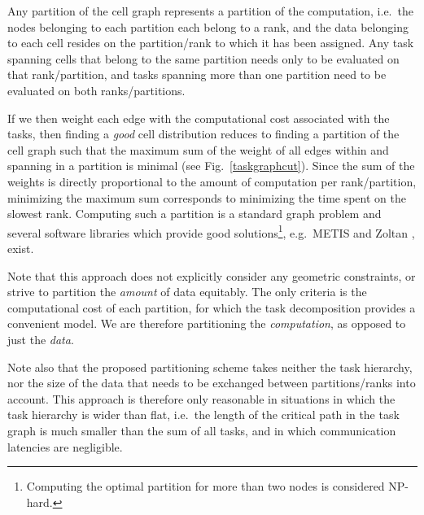 \documentclass{sig-alternate-05-2015}
\begin{document}
Any partition of the cell graph represents a partition of the
computation, i.e.~the nodes belonging to each partition each belong
to a rank, and the
data belonging to each cell resides on the partition/rank to which
it has been assigned.
Any task spanning cells that belong to the same partition needs only
to be evaluated on that rank/partition, and tasks spanning more than
one partition need to be evaluated on both ranks/partitions.

If we then weight each edge with the computational cost associated with
the tasks, then finding a {\em good} cell distribution reduces to finding a
partition of the cell graph such that the maximum sum of the weight
of all edges within and spanning in a partition is minimal
(see Fig.~\ref{taskgraphcut}).
Since the sum of the weights is directly proportional to the amount
of computation per rank/partition, minimizing the maximum sum
corresponds to minimizing the time spent on the slowest rank.
Computing such a partition is a standard graph problem and several
software libraries which provide good solutions\footnote{Computing
the optimal partition for more than two nodes is considered NP-hard.},
e.g.~METIS \cite{ref:Karypis1998} and Zoltan \cite{devine2002zoltan},
exist.

Note that this approach does not explicitly consider any geometric
constraints, or strive to partition the {\em amount} of data equitably.
The only criteria is the computational cost of each partition, for
which the task decomposition provides a convenient model.
We are therefore partitioning the {\em computation}, as opposed
to just the {\em data}.

Note also that the proposed partitioning scheme takes neither the
task hierarchy, nor the size of the data that needs to be exchanged
between partitions/ranks into account.
This approach is therefore only reasonable in situations in which
the task hierarchy is wider than flat, i.e.~the length of the critical
path in the task graph is much smaller than the sum of all tasks,
and in which communication latencies are negligible.
\end{document}
